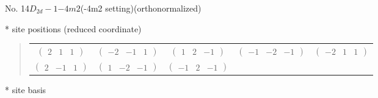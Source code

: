 \documentclass[fleqn,9pt,landscape]{jsarticle}
\begin{document}
\newpage
\begin{center}
\LARGE
No. 14\quad$D_{2d}-1$\quad$-4m2$\quad(-4m2 setting)\quad[ tetragonal ] (orthonormalized)
\end{center}
\vspace{5mm}
* site positions (reduced coordinate)
\begin{quote}
\begin{tabular}{ccccc}
$ \begin{pmatrix} 2 & 1 & 1 \end{pmatrix} $ & $ \begin{pmatrix} -2 & -1 & 1 \end{pmatrix} $ & $ \begin{pmatrix} 1 & 2 & -1 \end{pmatrix} $ & $ \begin{pmatrix} -1 & -2 & -1 \end{pmatrix} $ & $ \begin{pmatrix} -2 & 1 & 1 \end{pmatrix} $ \\
$ \begin{pmatrix} 2 & -1 & 1 \end{pmatrix} $ & $ \begin{pmatrix} 1 & -2 & -1 \end{pmatrix} $ & $ \begin{pmatrix} -1 & 2 & -1 \end{pmatrix} $ & $  $ & $  $
\end{tabular}
\end{quote}
* site basis
\end{document}
